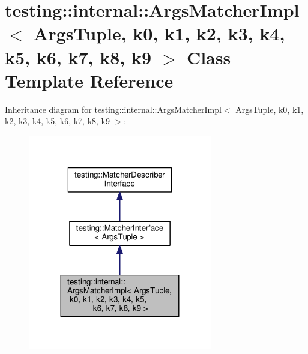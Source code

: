 \hypertarget{classtesting_1_1internal_1_1_args_matcher_impl}{}\section{testing\+:\+:internal\+:\+:Args\+Matcher\+Impl$<$ Args\+Tuple, k0, k1, k2, k3, k4, k5, k6, k7, k8, k9 $>$ Class Template Reference}
\label{classtesting_1_1internal_1_1_args_matcher_impl}


Inheritance diagram for testing\+:\+:internal\+:\+:Args\+Matcher\+Impl$<$ Args\+Tuple, k0, k1, k2, k3, k4, k5, k6, k7, k8, k9 $>$\+:
\nopagebreak
\begin{figure}[H]
\begin{center}
\leavevmode
\includegraphics[width=227pt]{classtesting_1_1internal_1_1_args_matcher_impl__inherit__graph}
\end{center}
\end{figure}


